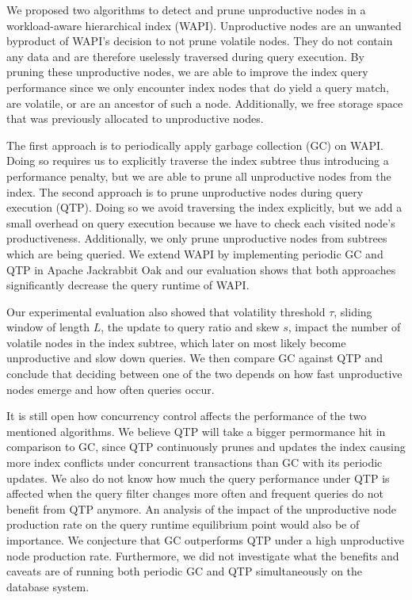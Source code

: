 \documentclass[abstracton,12pt]{scrartcl}
\theoremstyle{definition}
\begin{document}
We proposed two algorithms to detect and prune unproductive nodes in a workload-aware
hierarchical index (WAPI). Unproductive nodes are an unwanted byproduct of
WAPI's decision to not prune volatile nodes. They do not contain any data
and are therefore uselessly traversed during query execution.
By pruning these unproductive nodes, we are able to improve the
index query performance since we only encounter index nodes that do yield a
query match, are volatile, or are an ancestor of such a node.
Additionally, we free storage space that was previously allocated to unproductive nodes.

The first approach is to periodically apply garbage collection (GC) on WAPI. Doing so
requires us to explicitly traverse the index subtree thus introducing a performance penalty,
but we are able to prune all unproductive nodes from the index.
The second approach is to prune unproductive nodes during query execution (QTP). Doing so we
avoid traversing the index explicitly, but we add a small overhead on query execution
because we have to check each visited node's productiveness.
Additionally, we only prune unproductive nodes from subtrees which are being queried.
We extend WAPI by implementing periodic GC and QTP in Apache Jackrabbit Oak
and our evaluation shows that both approaches significantly decrease the query runtime of WAPI.

Our experimental evaluation also showed that volatility threshold $\tau$, sliding
window of length $L$, the update to query ratio and skew $s$, impact the number
of volatile nodes in the index subtree, which later on most likely become
unproductive and slow down queries. We then compare GC against QTP and conclude
that deciding between one of the two depends on how fast unproductive nodes emerge 
and how often queries occur.

It is still open how concurrency control affects the performance of the two mentioned
algorithms. We believe QTP will take a bigger permormance hit in comparison to GC, since
QTP continuously prunes and updates the index causing more index conflicts under
concurrent transactions than GC with its periodic updates. 
We also do not know how much the query performance under QTP is affected when the
query filter changes more often and frequent queries do not benefit
from QTP anymore.
An analysis of the impact of the unproductive node production rate on the
query runtime equilibrium point would also be of importance. We conjecture that
GC outperforms QTP under a high unproductive node production rate.
Furthermore, we did not investigate what the benefits and caveats
are of running both periodic GC and QTP simultaneously on the database system.
\end{document}
